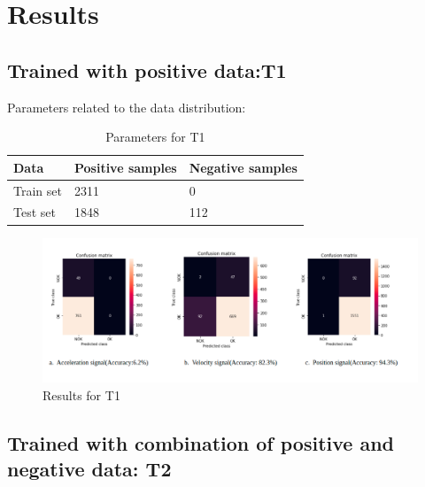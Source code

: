   \section{Results}  
  
  \subsection{Trained with positive data:T1}
   Parameters related to the  data distribution:
  \begin{table}[h]
  	\begin{tabular}{|l|l|l|}
  		\hline
  		Data      & Positive samples & Negative samples \\ \hline
  		Train set & 2311             & 0                \\ \hline
  		Test set  & 1848             & 112              \\ \hline
  	\end{tabular}
  	\caption{Parameters for T1}
  \end{table}
   	    \begin{figure}[h]
   	    	\centering
   	    	\includegraphics[width=1\linewidth]{images/r3.png}
   	    	\caption{Results for T1}
   	    	\label{r3}
   	    \end{figure}
   	
     \subsection{Trained with combination of positive  and negative data: T2}
     
